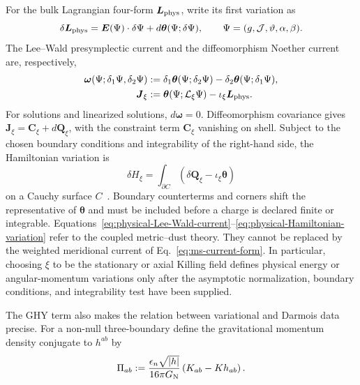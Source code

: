 For the bulk Lagrangian four-form $\boldsymbol L_{\rm phys}$, write its
first variation as
\begin{equation}
 \delta\boldsymbol L_{\rm phys}
 =\boldsymbol E(\Psi)\cdot\delta\Psi
 +d\boldsymbol\theta(\Psi;\delta\Psi),
 \qquad
 \Psi=(g,\mathcal J,\vartheta,\alpha,\beta).
 \label{eq:physical-covariant-first-variation}
\end{equation}
The Lee--Wald presymplectic current and the diffeomorphism Noether current
are, respectively,
\begin{align}
 \boldsymbol\omega(\Psi;\delta_1\Psi,\delta_2\Psi)
 &:={\delta_1}\boldsymbol\theta(\Psi;\delta_2\Psi)
 -{\delta_2}\boldsymbol\theta(\Psi;\delta_1\Psi),
 \label{eq:physical-Lee-Wald-current}\\
 \boldsymbol J_\xi
 &:=\boldsymbol\theta(\Psi;\mathcal L_\xi\Psi)
 -\iota_\xi\boldsymbol L_{\rm phys}.
 \label{eq:physical-diffeomorphism-current}
\end{align}
For solutions and linearized solutions,
$d\boldsymbol\omega=0$. Diffeomorphism covariance gives
$\boldsymbol J_\xi=\boldsymbol C_\xi+d\boldsymbol Q_\xi$, with the
constraint term $\boldsymbol C_\xi$ vanishing on shell. Subject to the
chosen boundary conditions and integrability of the right-hand side, the
Hamiltonian variation is
\begin{equation}
 \delta H_\xi
 =\int_{\partial C}
 \left(\delta\boldsymbol Q_\xi
 -\iota_\xi\boldsymbol\theta\right)
 \label{eq:physical-Hamiltonian-variation}
\end{equation}
on a Cauchy surface $C$~\cite{LeeWald1990JMP,IyerWald1994PRD}. Boundary
counterterms and corners shift the representative of
$\boldsymbol\theta$ and must be included before a charge is declared
finite or integrable. Equations~\eqref{eq:physical-Lee-Wald-current}--\eqref{eq:physical-Hamiltonian-variation}
refer to the coupled metric--dust theory. They cannot be replaced by the
weighted meridional current of
Eq.~\eqref{eq:ms-current-form}.
In particular, choosing $\xi$ to be the stationary or axial Killing field
defines physical energy or angular-momentum variations only after the
asymptotic normalization, boundary conditions, and integrability test have
been supplied.

The GHY term also makes the relation between variational and Darmois data
precise. For a non-null three-boundary define the gravitational momentum
density conjugate to $h^{ab}$ by
\begin{equation}
 \Pi_{ab}:=
 \frac{\epsilon_n\sqrt{|h|}}{16\pi G_{\rm N}}
 \left(K_{ab}-Kh_{ab}\right).
 \label{eq:physical-boundary-momentum}
\end{equation}

